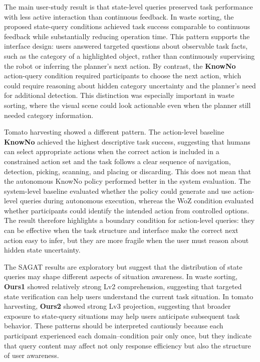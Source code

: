 The main user-study result is that state-level queries preserved task performance with less active interaction than continuous feedback. In waste sorting, the proposed state-query conditions achieved task success comparable to continuous feedback while substantially reducing operation time. This pattern supports the interface design: users answered targeted questions about observable task facts, such as the category of a highlighted object, rather than continuously supervising the robot or inferring the planner's next action. By contrast, the \textbf{KnowNo} action-query condition required participants to choose the next action, which could require reasoning about hidden category uncertainty and the planner's need for additional detection. This distinction was especially important in waste sorting, where the visual scene could look actionable even when the planner still needed category information.

Tomato harvesting showed a different pattern. The action-level baseline \textbf{KnowNo} achieved the highest descriptive task success, suggesting that humans can select appropriate actions when the correct action is included in a constrained action set and the task follows a clear sequence of navigation, detection, picking, scanning, and placing or discarding. This does not mean that the autonomous KnowNo policy performed better in the system evaluation. The system-level baseline evaluated whether the policy could generate and use action-level queries during autonomous execution, whereas the WoZ condition evaluated whether participants could identify the intended action from controlled options. The result therefore highlights a boundary condition for action-level queries: they can be effective when the task structure and interface make the correct next action easy to infer, but they are more fragile when the user must reason about hidden state uncertainty.

The SAGAT results are exploratory but suggest that the distribution of state queries may shape different aspects of situation awareness. In waste sorting, \textbf{Ours1} showed relatively strong Lv2 comprehension, suggesting that targeted state verification can help users understand the current task situation. In tomato harvesting, \textbf{Ours2} showed strong Lv3 projection, suggesting that broader exposure to state-query situations may help users anticipate subsequent task behavior. These patterns should be interpreted cautiously because each participant experienced each domain--condition pair only once, but they indicate that query content may affect not only response efficiency but also the structure of user awareness.

